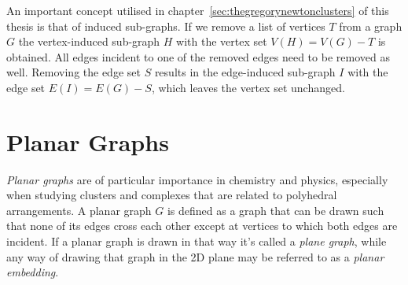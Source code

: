 An important concept utilised in chapter~\ref{sec:thegregorynewtonclusters} of
this thesis is that of induced sub-graphs. If we remove a list of vertices $T$
from a graph $G$ the vertex-induced sub-graph $H$ with the vertex set
$V(H)=V(G)-T$ is obtained. All edges incident to one of the removed edges need
to be removed as well. Removing the edge set $S$ results in the edge-induced
sub-graph $I$ with the edge set $E(I)=E(G)-S$, which leaves the vertex set
unchanged.

\section{Planar Graphs}
\label{sec:PlanarGraphs}

\textit{Planar graphs} are of particular importance in chemistry and physics,
especially when studying clusters and complexes that are related to polyhedral
arrangements.  A planar graph $G$ is defined as a graph that can be drawn such
that none of its edges cross each other except at vertices to which both edges
are incident. If a planar graph is drawn in that way it's called a
\textit{plane graph}, while any way of drawing that graph in the 2D plane may
be referred to as a \textit{planar embedding}.

